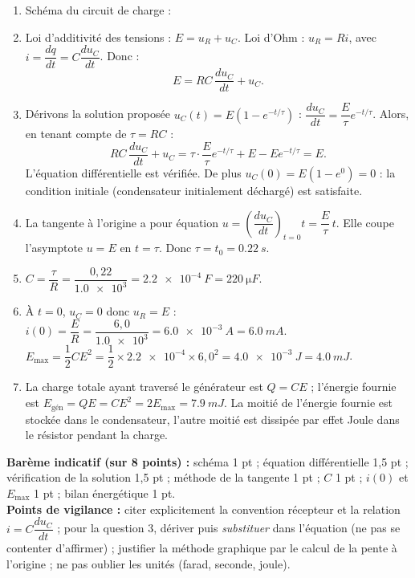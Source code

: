 \documentclass[11pt]{article}
\newcommand{\legende}[1]{\par\vspace{6pt}{\popsemi\fontsize{9}{11.5}\selectfont\color{popmuted}#1}}
\begin{document}
\begin{corrige}
\begin{enumerate}
\item Schéma du circuit de charge :
\begin{popfigure}
\legende{Circuit de charge du dipôle RC série.}
\end{popfigure}
\item Loi d'additivité des tensions : $E = u_R + u_C$. Loi d'Ohm : $u_R = Ri$, avec $i = \dfrac{dq}{dt} = C\dfrac{du_C}{dt}$. Donc :
\[ E = RC\,\dfrac{du_C}{dt} + u_C. \]
\item Dérivons la solution proposée $u_C(t) = E\left(1 - e^{-t/\tau}\right)$ : $\dfrac{du_C}{dt} = \dfrac{E}{\tau}e^{-t/\tau}$. Alors, en tenant compte de $\tau = RC$ :
\[ RC\,\dfrac{du_C}{dt} + u_C = \tau\cdot\dfrac{E}{\tau}e^{-t/\tau} + E - Ee^{-t/\tau} = E. \]
L'équation différentielle est vérifiée. De plus $u_C(0) = E(1 - e^{0}) = 0$ : la condition initiale (condensateur initialement déchargé) est satisfaite.
\item La tangente à l'origine a pour équation $u = \left(\dfrac{du_C}{dt}\right)_{t=0} t = \dfrac{E}{\tau}\,t$. Elle coupe l'asymptote $u = E$ en $t = \tau$. Donc $\tau = t_0 = \SI{0,22}{s}$.
\item $C = \dfrac{\tau}{R} = \dfrac{0,22}{\num{1,0e3}} = \SI{2,2e-4}{F} = \SI{220}{\micro F}$.
\item À $t = 0$, $u_C = 0$ donc $u_R = E$ : $i(0) = \dfrac{E}{R} = \dfrac{6,0}{\num{1,0e3}} = \SI{6,0e-3}{A} = \SI{6,0}{mA}$.\\
$E_{\max} = \dfrac{1}{2}CE^2 = \dfrac{1}{2}\times \num{2,2e-4}\times 6,0^2 = \SI{4,0e-3}{J} = \SI{4,0}{mJ}$.
\item La charge totale ayant traversé le générateur est $Q = CE$ ; l'énergie fournie est $E_{\text{gén}} = QE = CE^2 = 2E_{\max} = \SI{7,9}{mJ}$. La moitié de l'énergie fournie est stockée dans le condensateur, l'autre moitié est dissipée par effet Joule dans le résistor pendant la charge.
\end{enumerate}
\textbf{Barème indicatif (sur 8 points) :} schéma 1 pt ; équation différentielle 1,5 pt ; vérification de la solution 1,5 pt ; méthode de la tangente 1 pt ; $C$ 1 pt ; $i(0)$ et $E_{\max}$ 1 pt ; bilan énergétique 1 pt.\\
\textbf{Points de vigilance :} citer explicitement la convention récepteur et la relation $i = C\dfrac{du_C}{dt}$ ; pour la question 3, dériver puis \emph{substituer} dans l'équation (ne pas se contenter d'affirmer) ; justifier la méthode graphique par le calcul de la pente à l'origine ; ne pas oublier les unités (farad, seconde, joule).
\end{corrige}
\end{document}
